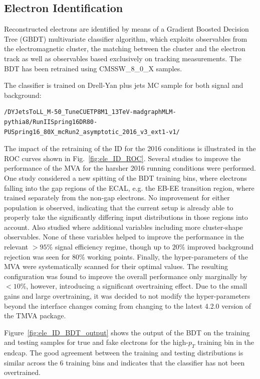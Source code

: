 \subsection{Electron Identification}
\label{sec:eleID}

Reconstructed electrons are identified by means of a Gradient Boosted Decision Tree (GBDT) multivariate classifier algorithm, which exploits observables from the electromagnetic cluster, the matching between the cluster and the electron track as well as observables based exclusively on tracking measurements. 
The BDT has been retrained using CMSSW\_8\_0\_X samples.

The classifier is trained on  Drell-Yan plus jets MC sample for both signal and background: 
{
\tiny  
\begin{verbatim}
/DYJetsToLL_M-50_TuneCUETP8M1_13TeV-madgraphMLM-pythia8/RunIISpring16DR80-PUSpring16_80X_mcRun2_asymptotic_2016_v3_ext1-v1/
\end{verbatim}
}

The impact of the retraining of the ID for the 2016 conditions is illustrated in the ROC curves shown in Fig.~\ref{fig:ele_ID_ROC}. Several studies to improve the performance of the MVA for the harsher 2016 running conditions were performed. 
One study considered a new spitting of the BDT training bins, where electrons falling into the gap regions of the ECAL, e.g. the EB-EE transition region, where trained separately from the non-gap electrons. 
No improvement for either population is observed, indicating that the current setup is already able to properly take the significantly differing input distributions in those regions into account. 
Also studied where additional variables including more cluster-shape observables. 
None of these variables helped to improve the performance in the relevant $>95\%$ signal efficiency regime, though up to $20\%$ improved background rejection was seen for $80\%$ working points. 
Finally, the hyper-parameters of the MVA were systematically scanned for their optimal values. The resulting configuration was found to improve the overall performance only marginally by $<10\%$, however, introducing a significant overtraining effect. 
Due to the small gains and large overtraining, it was decided to not modify the hyper-parameters beyond the interface changes coming from changing to the latest 4.2.0 version of the TMVA package.

Figure~\ref{fig:ele_ID_BDT_output} shows the output of the BDT on the training and testing samples for true and fake electrons 
for the high-$p_T$ training bin in the endcap. 
The good agreement between the training and testing distributions is similar across the 6 training bins and indicates that the classifier has not been overtrained.

